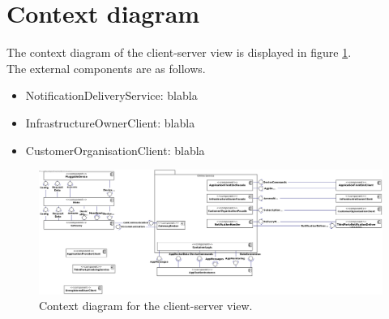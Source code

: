 
\showcsnotes{}

\section{Context diagram}
    The context diagram of the client-server view is displayed in figure \ref{fig:cc-context}. \\

    The external components are as follows.
    \begin{itemize}
        \item NotificationDeliveryService: blabla
        \item InfrastructureOwnerClient: blabla
        \item CustomerOrganisationClient: blabla
    \end{itemize}



    \begin{landscape}
        \centering
        \vspace*{\fill}

        \begin{figure}[!htp]
            \centering
            \includegraphics[width=\linewidth]{images/component-CONTEXT}
            \caption{Context diagram for the client-server view.}\label{fig:cc-context}
        \end{figure}

        \vfill
    \end{landscape}

